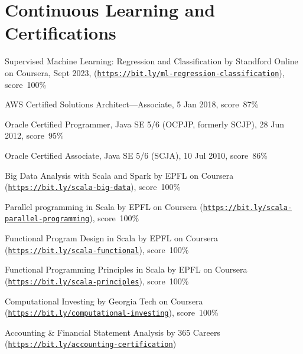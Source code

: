 \documentclass[letterpaper]{article}
\newenvironment{no-indent-itemize}{
  \begin{list}{}{
    \setlength{\leftmargin}{0em}
  }
}{
  \end{list}
}
\begin{document}
\section*{Continuous Learning and Certifications}
\begin{no-indent-itemize}
  \item Supervised Machine Learning: Regression and Classification by Standford Online on Coursera, Sept 2023, (\href{https://bit.ly/ml-regression-classification}{\tt https://bit.ly/ml-regression-classification}), score~100\%
  \item AWS Certified Solutions Architect---Associate, 5 Jan 2018, score~87\%
  \item Oracle Certified Programmer, Java SE 5/6 (OCPJP, formerly SCJP), 28 Jun 2012, score~95\%
  \item Oracle Certified Associate, Java SE 5/6 (SCJA), 10 Jul 2010, score~86\%
  \item Big Data Analysis with Scala and Spark by EPFL on Coursera 
        (\href{https://bit.ly/scala-big-data}{\tt https://bit.ly/scala-big-data}), score~100\%
  \item Parallel programming in Scala by EPFL on Coursera 
        (\href{https://bit.ly/scala-parallel-programming}{\tt https://bit.ly/scala-parallel-programming}), score~100\%
  \item Functional Program Design in Scala by EPFL on Coursera 
        (\href{https://bit.ly/scala-functional}{\tt https://bit.ly/scala-functional}), score~100\%
  \item Functional Programming Principles in Scala by EPFL on Coursera 
        (\href{https://bit.ly/scala-principles}{\tt https://bit.ly/scala-principles}), score~100\%
  \item Computational Investing by Georgia Tech on Coursera 
        (\href{https://bit.ly/computational-investing}{\tt https://bit.ly/computational-investing}), score~100\%
  \item Accounting \& Financial Statement Analysis by 365 Careers
        (\href{https://bit.ly/accounting-certification}{\tt https://bit.ly/accounting-certification})
\end{no-indent-itemize}
\end{document}
